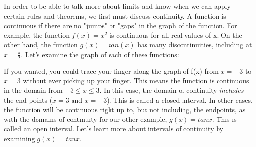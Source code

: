 In order to be able to talk more about limits and know when we can apply certain rules and theorems, we first must discuss continuity. A function is continuous if there are no "jumps" or "gaps" in the graph of the function. For example, the function $f(x) = x^2$ is continuous for all real values of x. On the other hand, the function $g(x) = tan(x)$ has many discontinuities, including at $x=\frac{\pi}{2}$. Let's examine the graph of each of these functions:


If you wanted, you could trace your finger along the graph of f(x) from $x=-3$ to $x=3$ without ever picking up your finger. This means the function is continuous in the domain from $-3 \leq x \leq 3$. In this case, the domain of continuity \textit{includes} the end points ($x=3$ and $x=-3$). This is called a closed interval. In other cases, the function will be continuous right up to, but not including, the endpoints, as with the domains of continuity for our other example, $g(x) = tanx$. This is called an open interval. Let's learn more about intervals of continuity by examining $g(x) = tanx$.

